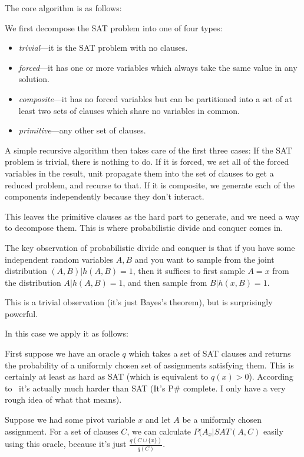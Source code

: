 The core algorithm is as follows:

We first decompose the SAT problem into one of four types:

\begin{itemize}
\item \emph{trivial}---it is the SAT problem with no clauses.
\item \emph{forced}---it has one or more variables which always take the same value in any solution.
\item \emph{composite}---it has no forced variables but can be partitioned into a set of at least two sets of clauses which share no variables in common.
\item \emph{primitive}---any other set of clauses.
\end{itemize}

A simple recursive algorithm then takes care of the first three cases:
If the SAT problem is trivial,
there is nothing to do.
If it is forced,
we set all of the forced variables in the result,
unit propagate them into the set of clauses to get a reduced problem,
and recurse to that.
If it is composite,
we generate each of the components independently because they don't interact.

This leaves the primitive clauses as the hard part to generate,
and we need a way to decompose them.
This is where probabilistic divide and conquer comes in.

The key observation of probabilistic divide and conquer is that if you have some independent random variables \(A, B\) and you want to sample from the joint distribution \((A, B) | h(A, B) = 1\),
then it suffices to first sample \(A = x\) from the distribution \(A | h(A, B) = 1\),
and then sample from \(B | h(x, B) = 1\).

This is a trivial observation (it's just Bayes's theorem),
but is surprisingly powerful.

In this case we apply it as follows:

First suppose we have an oracle \(q\) which takes a set of SAT clauses and returns the probability of a uniformly chosen set of assignments satisfying them.
This is certainly at least as hard as SAT (which is equivalent to \(q(x) > 0\)).
According to~\cite{DBLP:conf/aaai/MeelVCFSFIM16} it's actually much harder than SAT (It's P\# complete. I only have a very rough idea of what that means).

Suppose we had some pivot variable \(x\) and let \(A\) be a uniformly chosen assignment.
For a set of clauses \(C\),
we can calculate \(P(A_x | SAT(A, C)\) easily using this oracle,
because it's just \(\frac{q(C \cup \{x\})}{q(C)}\).

